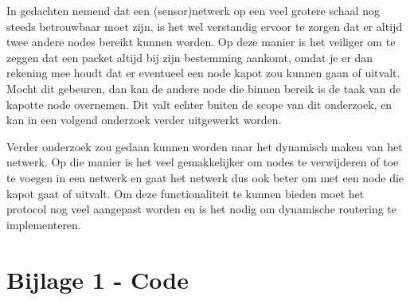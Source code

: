 \documentclass[a4paper,10pt]{article}
\begin{document}
In gedachten nemend dat een (sensor)netwerk op een veel grotere schaal nog steeds betrouwbaar moet zijn, is het wel verstandig ervoor te zorgen dat er altijd twee andere nodes bereikt kunnen worden. Op deze manier is het veiliger om te zeggen dat een packet altijd bij zijn bestemming aankomt, omdat je er dan rekening mee houdt dat er eventueel een node kapot zou kunnen gaan of uitvalt. Mocht dit gebeuren, dan kan de andere node die binnen bereik is de taak van de kapotte node overnemen. Dit valt echter buiten de scope van dit onderzoek, en kan in een volgend onderzoek verder uitgewerkt worden.

Verder onderzoek zou gedaan kunnen worden naar het dynamisch maken van het netwerk. Op die manier is het veel gemakkelijker om nodes te verwijderen of toe te voegen in een netwerk en gaat het netwerk dus ook beter om met een node die kapot gaat of uitvalt. Om deze functionaliteit te kunnen bieden moet het protocol nog veel aangepast worden en is het nodig om dynamische routering te implementeren.

\newpage
\appendix
\section{Bijlage 1 - Code}
\label{sec:code}

\end{document}
